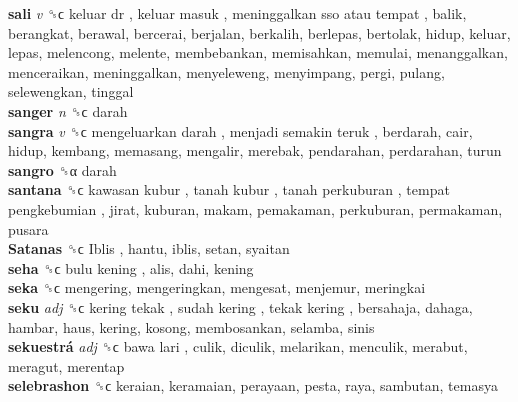 \textbf{sali} \emph{v}  ␝ϲ   keluar dr ,  keluar masuk ,  meninggalkan sso atau tempat , balik, berangkat, berawal, bercerai, berjalan, berkalih, berlepas, bertolak, hidup, keluar, lepas, melencong, melente, membebankan, memisahkan, memulai, menanggalkan, menceraikan, meninggalkan, menyeleweng, menyimpang, pergi, pulang, selewengkan, tinggal  \\
\textbf{sanger} \emph{n}  ␝ϲ  darah  \\
\textbf{sangra} \emph{v}  ␝ϲ   mengeluarkan darah ,  menjadi semakin teruk , berdarah, cair, hidup, kembang, memasang, mengalir, merebak, pendarahan, perdarahan, turun  \\
\textbf{sangro} ␝α  darah  \\
\textbf{santana} ␝ϲ   kawasan kubur ,  tanah kubur ,  tanah perkuburan ,  tempat pengkebumian , jirat, kuburan, makam, pemakaman, perkuburan, permakaman, pusara  \\
\textbf{Satanas} ␝ϲ   Iblis , hantu, iblis, setan, syaitan  \\
\textbf{seha} ␝ϲ   bulu kening , alis, dahi, kening  \\
\textbf{seka} ␝ϲ  mengering, mengeringkan, mengesat, menjemur, meringkai  \\
\textbf{seku} \emph{adj}  ␝ϲ   kering tekak ,  sudah kering ,  tekak kering , bersahaja, dahaga, hambar, haus, kering, kosong, membosankan, selamba, sinis  \\
\textbf{sekuestrá} \emph{adj}  ␝ϲ   bawa lari , culik, diculik, melarikan, menculik, merabut, meragut, merentap  \\
\textbf{selebrashon} ␝ϲ  keraian, keramaian, perayaan, pesta, raya, sambutan, temasya  \\
